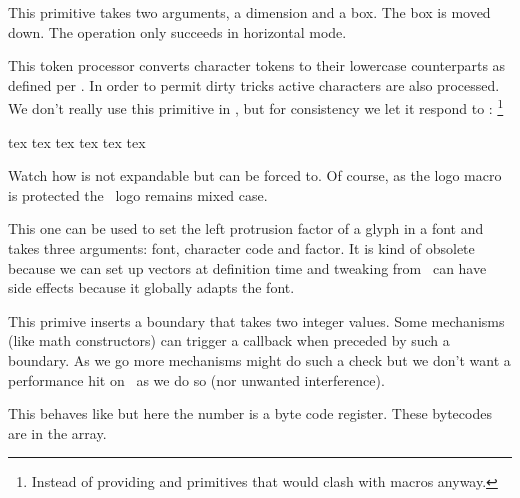 \startoldprimitive[title={\prm {lower}}]

This primitive takes two arguments, a dimension and a box. The box is moved down.
The operation only succeeds in horizontal mode.

\stopoldprimitive

\startoldprimitive[title={\prm {lowercase}}]

This token processor converts character tokens to their lowercase counterparts as
defined per . In order to permit dirty tricks active characters are
also processed. We don't really use this primitive in \CONTEXT, but for
consistency we let it respond to : \footnote {Instead of providing
\type {\lowercased} and \type {\uppercased} primitives that would clash with
macros anyway.}

\startbuffer
\edef           \foo       {\lowercase{tex TeX \TEX}} \meaningless\foo
\lowercase{\edef\foo                  {tex TeX \TEX}} \meaningless\foo
\edef           \foo{\expand\lowercase{tex TeX \TEX}} \meaningless\foo
\stopbuffer

\typebuffer

Watch how  is not expandable but can be forced to. Of course, as
the logo macro is protected the \TEX\ logo remains mixed case.

\startlines
\getbuffer
\stoplines

\stopoldprimitive

\startnewprimitive[title={\prm {lpcode}}]

This one can be used to set the left protrusion factor of a glyph in a font and
takes three arguments: font, character code and factor. It is kind of obsolete
because we can set up vectors at definition time and tweaking from \TEX\ can have
side effects because it globally adapts the font.

\stopnewprimitive

\startnewprimitive[title={\prm {luaboundary}}]

This primive inserts a boundary that takes two integer values. Some mechanisms
(like math constructors) can trigger a callback when preceded by such a boundary.
As we go more mechanisms might do such a check but we don't want a performance
hit on \CONTEXT\ as we do so (nor unwanted interference).

\stopnewprimitive

\startnewprimitive[title={\prm {luabytecode}}]

This behaves like  but here the number is a byte code register.
These bytecodes are in the  array.

